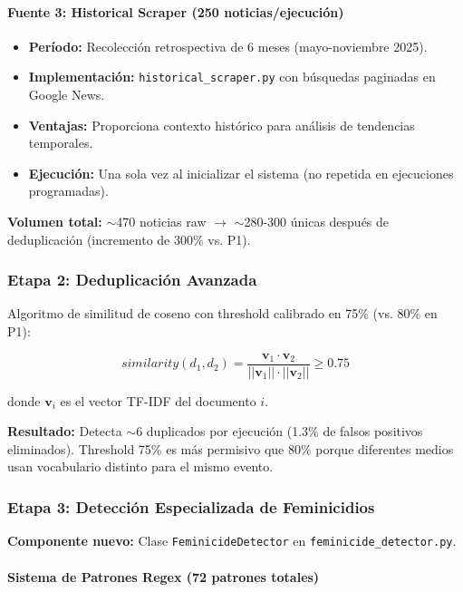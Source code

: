 \paragraph{Fuente 3: Historical Scraper (250 noticias/ejecución)}
\begin{itemize}
    \item \textbf{Período:} Recolección retrospectiva de 6 meses (mayo-noviembre 2025).
    \item \textbf{Implementación:} \texttt{historical\_scraper.py} con búsquedas paginadas en Google News.
    \item \textbf{Ventajas:} Proporciona contexto histórico para análisis de tendencias temporales.
    \item \textbf{Ejecución:} Una sola vez al inicializar el sistema (no repetida en ejecuciones programadas).
\end{itemize}

\textbf{Volumen total:} $\sim$470 noticias raw $\rightarrow$ $\sim$280-300 únicas después de deduplicación (incremento de 300\% vs. P1).

\subsubsection{Etapa 2: Deduplicación Avanzada}

Algoritmo de similitud de coseno con threshold calibrado en 75\% (vs. 80\% en P1):

\begin{equation}
similarity(d_1, d_2) = \frac{\mathbf{v}_1 \cdot \mathbf{v}_2}{||\mathbf{v}_1|| \cdot ||\mathbf{v}_2||} \geq 0.75
\end{equation}

donde $\mathbf{v}_i$ es el vector TF-IDF del documento $i$.

\textbf{Resultado:} Detecta $\sim$6 duplicados por ejecución (1.3\% de falsos positivos eliminados). Threshold 75\% es más permisivo que 80\% porque diferentes medios usan vocabulario distinto para el mismo evento.

\subsubsection{Etapa 3: Detección Especializada de Feminicidios}

\textbf{Componente nuevo:} Clase \texttt{FeminicideDetector} en \texttt{feminicide\_detector.py}.

\paragraph{Sistema de Patrones Regex (72 patrones totales)}

